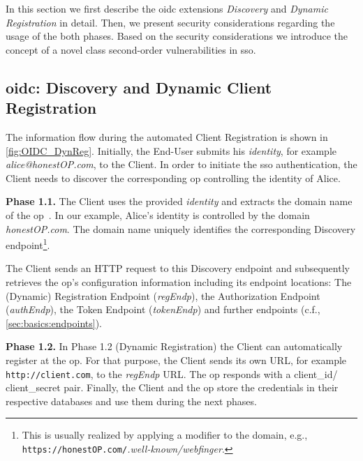 \documentclass[conference,compsoc]{IEEEtran}
\renewcommand*{\paragraph}[1]{\vspace{2mm}\noindent\textbf{#1.}}
\begin{document}
\label{sec:secondorder}

In this section we first describe the \gls{oidc} extensions \emph{Discovery} and \emph{Dynamic Registration} in detail. 
Then, we present security considerations regarding the usage of the both phases.
Based on the security considerations we introduce the concept of a novel class second-order vulnerabilities in \gls{sso}.

\subsection{\gls{oidc}: Discovery and Dynamic Client Registration}
The information flow during the automated Client Registration is shown in \autoref{fig:OIDC_DynReg}.
Initially, the End-User submits his \emph{identity}, for example \emph{alice@honestOP.com}, to the Client.
In order to initiate the \gls{sso} authentication, the Client needs to discover the corresponding \gls{op} controlling the identity of Alice.

\paragraph{Phase 1.1}
The Client uses the provided \emph{identity} and extracts the domain name of the \gls{op}~\cite[Section 2.1]{OpenIDFoundation2014a}.
In our example, Alice's identity is controlled by the domain \emph{honestOP.com}.
The domain name uniquely identifies the corresponding Discovery endpoint\footnote{This is usually realized by applying a modifier to the domain, e.g., \texttt{https://honestOP.com/}\emph{.well-known/webfinger}.}.

The Client sends an HTTP request to this Discovery endpoint and subsequently retrieves the \gls{op}'s configuration information including its endpoint locations:
The (Dynamic) Registration Endpoint (\emph{regEndp}), the Authorization Endpoint (\emph{authEndp}), the Token Endpoint (\emph{tokenEndp}) and further endpoints (c.f., \autoref{sec:basics:endpoints}).

\paragraph{Phase 1.2}
In Phase 1.2 (Dynamic Registration) the Client can automatically register at the \gls{op}.
For that purpose, the Client sends its own URL, for example \texttt{http://client.com}, to the \emph{regEndp} URL.
The \gls{op} responds with a \gls{client_id}/ \gls{client_secret} pair.
Finally, the Client and the \gls{op} store the credentials in their respective databases and use them during the next phases.
\end{document}
